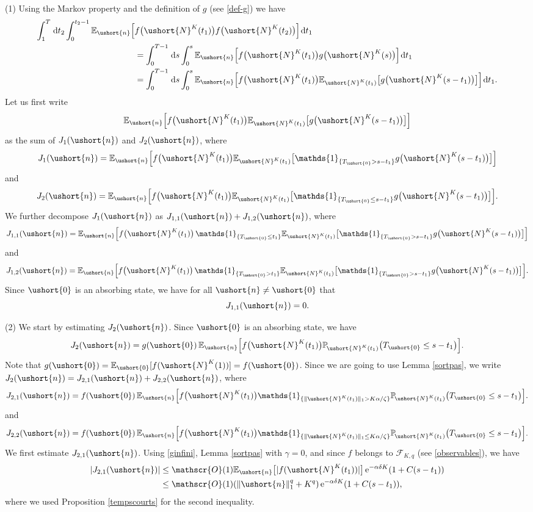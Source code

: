 \documentclass[10pt]{amsart}
\let\mathcal\mathscr
\numberwithin{equation}{section}
\theoremstyle{plain}
\theoremstyle{definition}
\newcommand{\proba}{{\mathbb{P}}}
\newcommand{\E}{{\mathbb{E}}}
\newcommand{\Oun}{\mathcal{O}(1)}
\newcommand{\sK}{K}
\newcommand{\un}{\mathds{1}}
\newcommand{\vecn}{\ushort{n}}
\newcommand{\veczer}{\ushort{0}}
\newcommand{\leproc}{\ushort{N}^{K}}
\newcommand{\sleproc}{\ushort{N}^{K}}
\newcommand{\e}{\operatorname{e}}
\newcommand{\dd}{\hspace{1pt}\mathrm{d}}
\newcommand{\norm}[1]{\|#1\|_{1}}\let\snorm\norm
\begin{document}
(1) Using the Markov property and the definition of $g$ (see \eqref{def-g}) we have
\begin{align*}
\int_{1}^{T} \dd t_{2}\int_{0}^{t_{2}-1}\E_{\vecn}\Bigl[&
f\bigl(\leproc(t_{1})\bigr) f\bigl(\leproc(t_{2})\bigr)\Bigr]\dd t_{1}\\
& =\int_{0}^{T-1} \dd s\int_{0}^{s}\E_{\vecn}\Bigl[
f\bigl(\leproc(t_{1})\bigr) g\bigl(\leproc(s)\bigr)\Bigr]\dd t_{1}\\
& = \int_{0}^{T-1} \dd s\int_{0}^{s}
\E_{\vecn}\Bigl[f\bigl(\leproc(t_{1})\bigr) \E_{\sleproc(t_{1}) } \bigl[g\bigl(\leproc(s-t_1)\bigr)\bigr]\Bigr]\dd t_{1}.
\end{align*}
Let us first write
\[
\E_{\vecn}\Bigl[f\bigl(\leproc(t_{1})\bigr) \E_{\sleproc(t_{1}) } \bigl[g\bigl(\leproc(s-t_1)\bigr)\bigr]\Bigr]
\]
as the sum of $J_{1}(\vecn)$ and $J_{2}(\vecn)$, where
\[
J_1(\vecn)=\E_{\vecn}\Bigl[f\bigl(\leproc(t_{1})\bigr)\E_{\sleproc(t_{1}) } \bigl[\un_{\{T_{\veczer} >s-t_1\}}g\bigl(\leproc(s-t_1)\bigr)\bigr]\Bigr]
\]
and
\[
J_2(\vecn)=\E_{\vecn}\Bigl[
f\bigl(\leproc(t_{1})\bigr) \E_{\sleproc(t_{1}) } \bigl[
\un_{\{T_{\veczer} \leq s-t_1\}}g\bigl(\leproc(s-t_1)\bigr)\bigr]\Bigr].
\]
We further decompose $J_1(\vecn)$ as $J_{1,1}(\vecn)+J_{1,2}(\vecn)$, where
\[
J_{1,1}(\vecn)=\E_{\vecn}\Bigl[
f\bigl(\leproc(t_{1})\bigr) \,\un_{\{T_{\veczer}\leq t_1\}}
\E_{\sleproc(t_{1}) }
\bigl[\un_{\{T_{\veczer} >s-t_1\}}g\bigl(\leproc(s-t_1)\bigr)\bigr]\Bigr]
\]
and
\[
J_{1,2}(\vecn)=\E_{\vecn}\Bigl[
f\bigl(\leproc(t_{1})\bigr)\,\un_{\{T_{\veczer}> t_1\}}
\E_{\sleproc(t_{1}) } \bigl[\un_{\{T_{\veczer} >s-t_1\}}g\bigl(\leproc(s-t_1)\bigr)\bigr]\Bigr].
\]
Since $\veczer$ is an absorbing state, we have for all $\vecn\neq \veczer$ that
\[
J_{1,1}(\vecn)=0.
\]

(2) We start by estimating $J_2(\vecn)$.
Since $\veczer$ is an absorbing state, we have
\[
J_2(\vecn)= g(\veczer)\, \E_{\vecn}\Bigl[
f\bigl(\leproc(t_{1})\bigr)\proba_{\!\sleproc(t_{1}) } \bigl(
T_{\veczer} \leq s-t_1\bigr)\Bigr].
\]
Note that $g(\veczer)= \E_{\veczer}[f(\leproc(1))]= f(\veczer)$.
Since we are going to use Lemma \ref{sortpas}, we write $J_2(\vecn)=J_{2,1}(\vecn)+J_{2,2}(\vecn)$,
where
\[
J_{2,1}(\vecn)=
f(\veczer)\,\E_{\vecn}\Bigl[
f\bigl(\leproc(t_{1})\bigr) \un_{\{\|\leproc(t_1)\|_1> K\alpha/\zeta\}} \proba_{\!\leproc(t_{1}) } \bigl(
T_{\veczer} \leq s-t_1\bigr)\Bigr].
\]
and
\[
J_{2,2}(\vecn)= f(\veczer)\,
\E_{\vecn}\Bigl[
f\bigl(\leproc(t_{1})\bigr) \un_{\{\|\leproc(t_1)\|_1\leq K\alpha/\zeta\}} \proba_{\!\leproc(t_{1}) } \bigl(
T_{\veczer} \leq s-t_1\bigr)\Bigr].
\]
We first estimate $J_{2,1}(\vecn)$.
Using \eqref{ginfini}, Lemma \ref{sortpas} with $\gamma=0$,
and since $f$ belongs to $\mathscr{F}\!_{\sK,q}$ (see \eqref{observables}), we have
\begin{align*}
|J_{2,1}(\vecn)|
& \leq \Oun \E_{\vecn}\bigl[|f(\leproc(t_1))|\bigr] \e^{- \alpha \delta K}(1+C {(s-t_1)})\\
& \leq \Oun (\norm{\vecn}^{q} + K^q) \e^{- \alpha \delta K}(1+C {(s-t_1)}),
\end{align*}
where we used Proposition \ref{tempscourts} for the second inequality.
\end{document}
